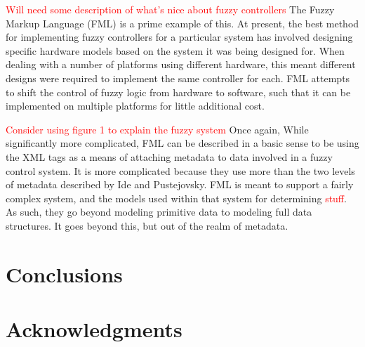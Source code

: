 \documentclass{sig-alternate}
\newcommand{\mycomment}[1]{\textcolor{red}{#1}}
\begin{document}
\mycomment{Will need some description of what's nice about fuzzy controllers}
The Fuzzy Markup Language (FML) is a prime example of this. At present, the best method for implementing fuzzy controllers for a particular system has involved designing specific hardware models based on the system it was being designed for. When dealing with a number of platforms using different hardware, this meant different designs were required to implement the same controller for each. FML attempts to shift the control of fuzzy logic from hardware to software, such that it can be implemented on multiple platforms for little additional cost.

\mycomment{Consider using \cite{Acampora:2013} figure 1 to explain the fuzzy system}
Once again, 
While significantly more complicated, FML can be described in a basic sense to be using the XML tags as a means of attaching metadata to data involved in a fuzzy control system. It is more complicated because they use more than the two levels of metadata described by Ide and Pustejovsky. FML is meant to support a fairly complex system, and the models used within that system for determining \textcolor{red}{stuff}. As such, they go beyond modeling primitive data to modeling full data structures. It goes beyond this, but out of the realm of metadata. 

\section{Conclusions}


\section{Acknowledgments}




\end{document}
